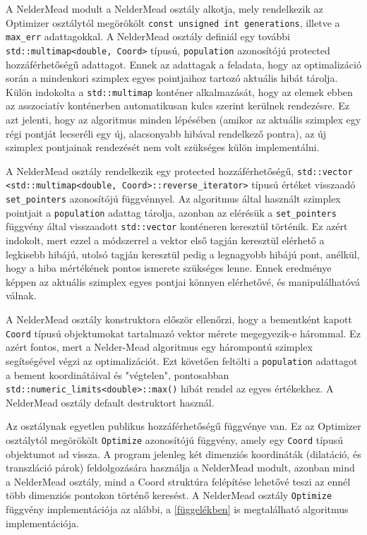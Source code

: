 \documentclass[oneside,titlepage,12pt,a4paper]{report}
\begin{document}
\par A NelderMead modult a NelderMead osztály alkotja, mely rendelkezik az Optimizer osztálytól megörökölt \texttt{const unsigned int generations}, illetve a \texttt{max\_err} adattagokkal. A NelderMead osztály definiál egy további \texttt{std::multimap<double, Coord>} típusú, \texttt{population} azonosítójú protected hozzáférhetőségű adattagot. Ennek az adattagak a feladata, hogy az optimalizáció során a mindenkori szimplex egyes pointjaihoz tartozó aktuális hibát tárolja. Külön indokolta a \texttt{std::multimap} konténer alkalmazását, hogy az elemek ebben az asszociatív konténerben automatikusan kulcs szerint kerülnek rendezésre. Ez azt jelenti, hogy az algoritmus minden lépésében (amikor az aktuális szimplex egy régi pontját lecseréli egy új, alacsonyabb hibával rendelkező pontra), az új szimplex pontjainak rendezését nem volt szükséges külön implementálni. 
\par A NelderMead osztály rendelkezik egy protected hozzáférhetőségű, \texttt{std::vector} \texttt{<std::multimap<double, Coord>::reverse\_iterator>} típusú értéket visszaadó \linebreak \texttt{set\_pointers} azonosítójú függvénnyel. Az algoritmus által használt szimplex pointjait a \texttt{population} adattag tárolja, azonban az elérésük a \texttt{set\_pointers} függvény által visszaadott \texttt{std::vector} konténeren keresztül történik. Ez azért indokolt, mert ezzel a módszerrel a vektor első tagján keresztül elérhető a legkisebb hibájú, utolsó tagján keresztül pedig a legnagyobb hibájú pont, anélkül, hogy a hiba mértékének pontos ismerete szükséges lenne. Ennek eredménye képpen az aktuális szimplex egyes pontjai könnyen elérhetővé, és manipulálhatóvá válnak. 

\par A NelderMead osztály konstruktora először ellenőrzi, hogy a bementként kapott \texttt{Coord} típusú objektumokat tartalmazó vektor mérete megegyezik-e hárommal. Ez azért fontos, mert a Nelder-Mead algoritmus egy hárompontú szimplex segítségével végzi az optimalizációt. Ezt követően feltölti a \texttt{population} adattagot a bement koordinátáival és "végtelen", pontosabban \texttt{std::numeric\_limits<double>::max()} hibát rendel az egyes értékekhez. A NelderMead osztály default destruktort használ. 
\par Az osztálynak egyetlen publikus hozzáférhetőségű függvénye van. Ez az Optimizer osztálytól megörökölt \texttt{Optimize} azonosítójú függvény, amely egy \texttt{Coord} típusú objektumot ad vissza. A program jelenleg két dimenziós koordináták (dilatáció, és transzláció párok) feldolgozására használja a NelderMead modult, azonban mind a NelderMead osztály, mind a Coord struktúra felépítése lehetővé teszi az ennél több dimenziós pontokon történő keresést. A NelderMead osztály \texttt{Optimize} függvény implementációja az alábbi, a \ref{függelékben} is megtalálható algoritmus implementációja. 
\end{document}
